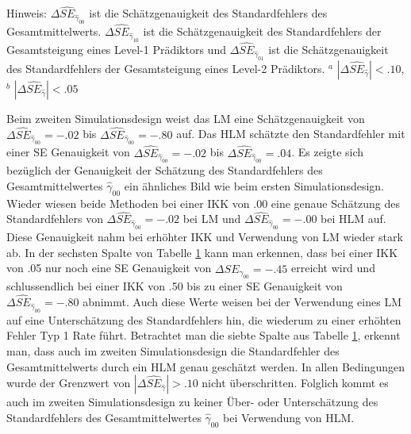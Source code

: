 \documentclass[12pt, a4paper]{article}\usepackage[]{graphicx}\usepackage[]{color}
\begin{document}
\begin{table}[t!]
\begin{threeparttable}
\begin{tabular}{lcccccccc}
\bottomrule
\end{tabular}
\label{tab:study1_results}
\begin{tablenotes}[flushleft]
\footnotesize
\item Hinweis: $\Delta\widehat{SE}_{\widehat{\gamma}_{00}}$ ist die Schätzgenauigkeit des Standardfehlers des Gesamtmittelwerts. $\Delta\widehat{SE}_{\widehat{\gamma}_{10}}$ ist die Schätzgenauigkeit des Standardfehlers der Gesamtsteigung eines Level-1 Prädiktors und $\Delta\widehat{SE}_{\widehat{\gamma}_{01}}$ ist die Schätzgenauigkeit des Standardfehlers der Gesamtsteigung eines Level-2 Prädiktors. $^a$ $|\Delta\widehat{SE}_{\widehat{\gamma}}| < .10$, $^b$ $|\Delta\widehat{SE}_{\widehat{\gamma}}| < .05$
\end{tablenotes}
\end{threeparttable}
\end{table}

Beim zweiten Simulationsdesign weist das LM eine Schätzgenauigkeit von $\Delta\widehat{SE}_{\widehat{\gamma}_{00}} = -.02$ bis $\Delta\widehat{SE}_{\widehat{\gamma}_{00}} = -.80$ auf. Das HLM schätzte den Standardfehler mit einer SE Genauigkeit von $\Delta\widehat{SE}_{\widehat{\gamma}_{00}} = -.02$ bis $\Delta\widehat{SE}_{\widehat{\gamma}_{00}} = .04$. Es zeigte sich bezüglich der Genauigkeit der Schätzung des Standardfehlers des Gesamtmittelwertes $\widehat{\gamma}_{00}$ ein ähnliches Bild wie beim ersten Simulationsdesign. Wieder wiesen beide Methoden bei einer IKK von .00 eine genaue Schätzung des Standardfehlers von $\Delta\widehat{SE}_{\widehat{\gamma}_{00}} = -.02$ bei LM und $\Delta\widehat{SE}_{\widehat{\gamma}_{00}} = -.00$ bei HLM auf. Diese Genauigkeit nahm bei erhöhter IKK und Verwendung von LM wieder stark ab. In der sechsten Spalte von Tabelle \ref{tab:study1_results} kann man erkennen, dass bei einer IKK von .05 nur noch eine SE Genauigkeit von $\Delta\widehat{SE}_{\widehat{\gamma}_{00}} = -.45$ erreicht wird und schlussendlich bei einer IKK von .50 bis zu einer SE Genauigkeit von $\Delta\widehat{SE}_{\widehat{\gamma}_{00}} = -.80$ abnimmt. Auch diese Werte weisen bei der Verwendung eines LM auf eine Unterschätzung des Standardfehlers hin, die wiederum zu einer erhöhten Fehler Typ 1 Rate führt. Betrachtet man die siebte Spalte aus Tabelle \ref{tab:study1_results}, erkennt man, dass auch im zweiten Simulationsdesign die Standardfehler des Gesamtmittelwerts durch ein HLM genau geschätzt werden. In allen Bedingungen wurde der Grenzwert von $|\Delta\widehat{SE}_{\widehat{\gamma}}| > .10$ nicht überschritten. Folglich kommt es auch im zweiten Simulationsdesign zu keiner Über- oder Unterschätzung des Standardfehlers des Gesamtmittelwertes $\widehat{\gamma}_{00}$ bei Verwendung von HLM.
\end{document}
